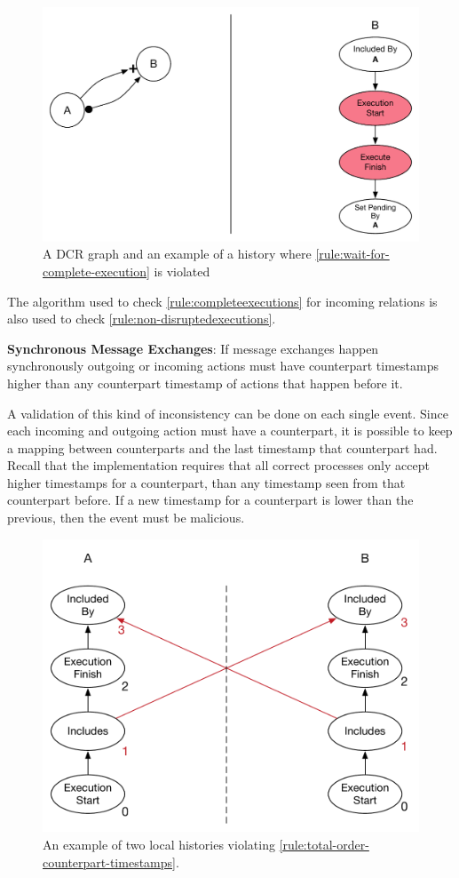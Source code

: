 	\begin{figure}[H]
		\centering
		\includegraphics[width=.7\textwidth]{6validation/images/wait-for-complete-execution.pdf}
		\caption{A DCR graph and an example of a history where \autoref{rule:wait-for-complete-execution} is violated}
		\label{fig:validation:wait-for-complete-execution}
	\end{figure}
	
	\noindent The algorithm used to check \autoref{rule:completeexecutions} for incoming relations is also used to check \autoref{rule:non-disruptedexecutions}.
		
	\begin{ruledef}
		\textbf{Synchronous Message Exchanges}: If message exchanges happen synchronously outgoing or incoming actions must have counterpart timestamps higher than any counterpart timestamp of actions that happen before it.
		\label{rule:total-order-counterpart-timestamps}
	\end{ruledef}
	
	\noindent A validation of this kind of inconsistency can be done on each single event. Since each incoming and outgoing action must have a counterpart, it is possible to keep a mapping between counterparts and the last timestamp that counterpart had. Recall that the implementation requires that all correct processes only accept higher timestamps for a counterpart, than any timestamp seen from that counterpart before.  If a new timestamp for a counterpart is lower than the previous, then the event must be malicious.
	
	\begin{figure}[H]
		\centering
		\includegraphics[width=.5\textwidth]{6validation/images/total-order-of-counterpart-timestamps-cycle.pdf}
		\caption{An example of two local histories violating \autoref{rule:total-order-counterpart-timestamps}.}
		\label{fig:validation:total-order-of-counterpart-timestamps}
	\end{figure}
	
